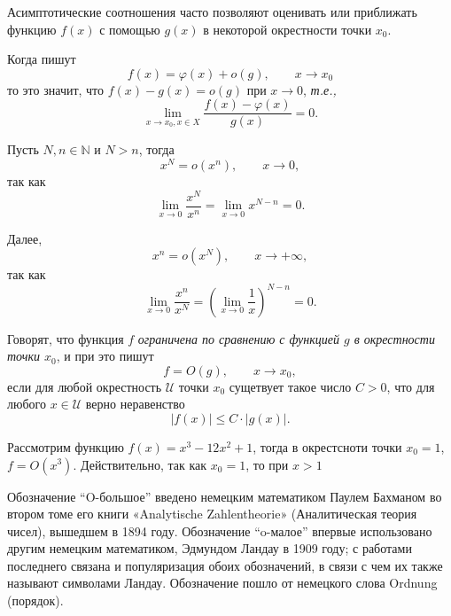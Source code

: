 \begin{remark}
Асимптотические соотношения часто позволяют оценивать или приближать функцию $f(x)$ с помощью $g(x)$ в некоторой окрестности точки $x_0$.

Когда пишут 
\[ 
 f(x) = \varphi(x) + o(g),  \qquad x \to x_0   
\]
то это значит, что $f(x) - g(x) = o(g)$ при $x \to 0$, \textit{т.е.,}
\[
 \lim_{x \to x_0, x \in X} \frac{f(x) - \varphi(x)}{g(x)} =0.
\]
\end{remark}

\begin{example}
 Пусть $N,n \in \mathbb{N}$ и $N>n$, тогда
 \[
  x^N = o(x^n), \qquad x \to 0,
 \]
 так как
 \[
  \lim_{x \to 0} \frac{x^N}{x^n}  = \lim_{x \to 0}x^{N-n} = 0.
 \]

 Далее,
 \[
  x^n = o(x^N), \qquad x \to +\infty,
 \]
 так как 
 \[
   \lim_{x \to 0} \frac{x^n}{x^N}  = \left(  \lim_{x \to 0}\frac{1}{x} \right)^{N-n} = 0.
 \]
\end{example}


\begin{definition}\label{O-big}
    Говорят, что функция $f$ \textit{ограничена по сравнению с функцией $g$ в окрестности точки $x_0$}, и при это пишут
    \[
     f = O(g), \qquad x \to x_0,
    \]
    если для любой окрестность $\mathscr{U}$ точки $x_0$ сущетвует такое число $C >0$, что для любого $x \in \mathscr{U}$ верно неравенство 
    \[
     |f(x)| \le C \cdot |g(x)|.
    \]
\end{definition}

\begin{example}
    Рассмотрим функцию $f(x) = x^3 - 12x^2 +1$, тогда в окрестсноти точки $x_0= 1$, $f = O(x^3)$. Действительно, так как $x_0 = 1$, то при $x>1$
\end{example}


\begin{hremark}
 Обозначение ``O-большое'' введено немецким математиком Паулем Бахманом во втором томе его книги «Analytische Zahlentheorie» (Аналитическая теория чисел), вышедшем в 1894 году. Обозначение ``o-малое'' впервые использовано другим немецким математиком, Эдмундом Ландау в 1909 году; с работами последнего связана и популяризация обоих обозначений, в связи с чем их также называют символами Ландау. Обозначение пошло от немецкого слова Ordnung (порядок).   
\end{hremark}





